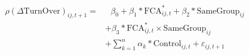 \begin{equation}
\begin{split}
\rho(\Delta \text{TurnOver})_{ij,t+1} = & \text{ 	}\beta_0 + \beta_1* \text{FCA}^*_{ij,t} + \beta_2* \text{SameGroup}_{ij} \\
 &	+\beta_3* \text{FCA}^*_{ij,t} \times \text{SameGroup}_{ij}   \\
  & + \sum_{k=1} ^{n} \alpha_k*\text{Control}_{ij,t} + \varepsilon_{ij,t+1}
\end{split}
\label{model4}
\end{equation}